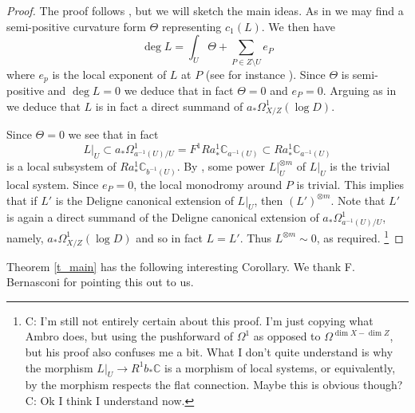 \documentclass[12pt]{amsart}
\begin{document}
\begin{proof}





The proof follows 
\cite[Proof of Lemma]{MR510945}, but we will sketch the main ideas.
As in \cite[Proof of Lemma]{MR510945} we may find a semi-positive curvature form $\Theta$ representing $c_1(L)$.
We then have \[\deg L = \int_{U} \Theta+\sum_{P \in Z \setminus U} e_P\]
where $e_p$ is the local exponent of $L$ at $P$ (see for instance \cite[Lemma 21]{kawamata81}).
Since $\Theta$ is semi-positive and $\deg L = 0$ we deduce that in fact $\Theta = 0$ and $e_P = 0$.
Arguing as in \cite[Proof of Lemma]{MR510945} we deduce that $L$ is in fact a direct summand 
of $a_*\Omega^1_{X/Z}(\log D)$.


Since $\Theta = 0$ we see that in fact 
\[L|_{U} \subset a_*\Omega^1_{a^{-1}(U)/U} = F^1Ra^1_*\mathbb C_{a^{-1}(U)} \subset Ra^1_*\mathbb C_{a^{-1}(U)}\] is a local subsystem of $Ra^1_*\mathbb C_{b^{-1}(U)}$. 
By \cite[Corollaire 4.2.8.iii.b]{MR498552}, some power $L|_U^{\otimes m}$ of $L|_U$ is the trivial local system.  Since $e_P = 0$, the local monodromy around $P$ is trivial.  This implies that if $L'$ is the Deligne canonical extension of $L|_U$, then $(L')^{\otimes m}$.  Note that $L'$ is again a direct summand of the Deligne canonical extension of $a_*\Omega^1_{a^{-1}(U)/U}$, namely, $a_*\Omega^1_{X/Z}(\log D)$ and so in fact $L = L'$.
Thus $L^{\otimes m} \sim 0$, as required.
\footnote{C: I'm still not entirely certain about this proof.  I'm just copying what Ambro does, but using the pushforward of $\Omega^1$ as opposed to $\Omega^{\dim X - \dim Z}$, but his proof also confuses me a bit.  What I don't quite understand is why the morphism $L|_U \to R^1b_*\mathbb C$ is a morphism of local systems, or equivalently, by the morphism respects the flat connection.  Maybe this is obvious though? C: Ok I think I understand now.}
\fi
\end{proof}



Theorem \ref{t_main} has the following interesting Corollary.  We thank F. Bernasconi for pointing this out to us.
\end{document}

